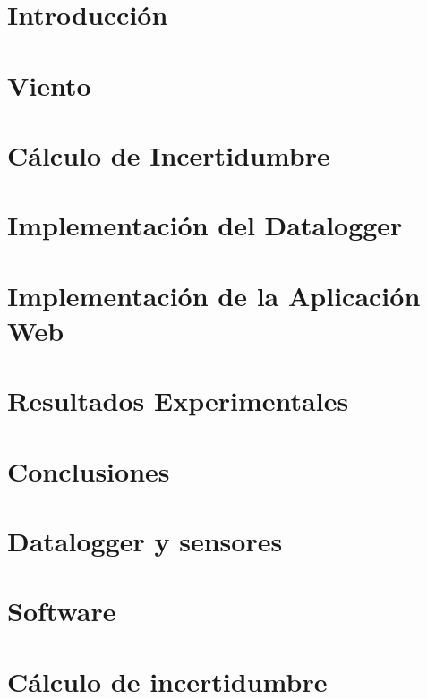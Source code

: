 \documentclass[11pt, a4paper,oneside]{book}
\begin{document}


\clearpage\hbox{}\thispagestyle{empty}\newpage

\clearpage\hbox{}\thispagestyle{empty}\newpage

\clearpage\hbox{}\thispagestyle{empty}\newpage

\clearpage\hbox{}\thispagestyle{empty}\newpage
\tableofcontents
\listoffigures
\listoftables
\newpage

\setcounter{page}{1}

\chapter{Introducción}\label{cap:introduccion}

\chapter{Viento}\label{cap:viento}

\chapter{Cálculo de Incertidumbre}\label{cap:incertidumbre}

\chapter{Implementación del Datalogger}\label{cap:datalogger}

\chapter{Implementación de la Aplicación Web}\label{cap:aplicacionweb}

\chapter{Resultados Experimentales}\label{cap:med_result}

\chapter{Conclusiones}



\appendix
\chapter{Datalogger y sensores}

\chapter{Software}

\chapter{Cálculo de incertidumbre}

\printbibliography
\end{document}
